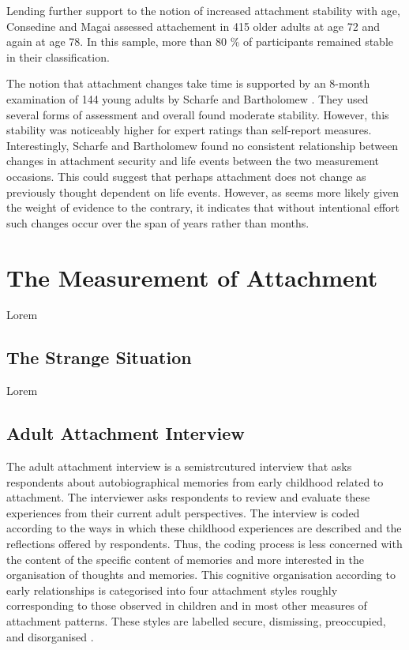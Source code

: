 \documentclass[12pt]{report}
\begin{document}
Lending further support to the notion of increased attachment stability with age, Consedine and Magai assessed attachement in 415 older adults at age 72 and again at age 78. In this sample, more than 80 \% of participants remained stable in their classification.

The notion that attachment changes take time is supported by an 8-month examination of 144 young adults by Scharfe and Bartholomew \cite{Scharfe1994}. They used several forms of assessment and overall found moderate stability. However, this stability was noticeably higher for expert ratings than self-report measures.
Interestingly, Scharfe and Bartholomew found no consistent relationship between changes in attachment security and life events between the two measurement occasions. This could suggest that perhaps attachment does not change as previously thought dependent on life events. However, as seems more likely given the weight of evidence to the contrary, it indicates that without intentional effort such changes occur over the span of years rather than months.

\section{The Measurement of Attachment}
Lorem

\subsection{The Strange Situation}
Lorem

\subsection{Adult Attachment Interview}
The adult attachment interview is a semistrcutured interview that asks respondents about autobiographical memories from early childhood related to attachment. The interviewer asks respondents to review and evaluate these experiences from their current adult perspectives. The interview is coded according to the ways in which these childhood experiences are described and the reflections offered by respondents. Thus, the coding process is less concerned with the content of the specific content of memories and more interested in the organisation of thoughts and memories. This cognitive organisation according to early relationships is categorised into four attachment styles roughly corresponding to those observed in children and in most other measures of attachment patterns. These styles are labelled secure, dismissing, preoccupied, and disorganised \cite{Hesse1999, AAITest}.
\end{document}
